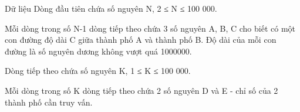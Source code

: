 Dữ liệu
Dòng đầu tiên chứa số nguyên N, 2 ≤ N ≤ 100 000.  

   Mỗi dòng trong số N-1 dòng tiếp theo chứa 3 số nguyên A, B, C cho biết có một con đường độ dài C giữa thành phố A và thành phố B. Độ dài của mỗi con đường là số nguyên dương không vượt quá 1000000.  

   Dòng tiếp theo chứa số nguyên K, 1 ≤ K ≤ 100 000.  

   Mỗi dòng trong số K dòng tiếp theo chứa 2 số nguyên D và E - chỉ số của 2 thành phố cần truy vấn.